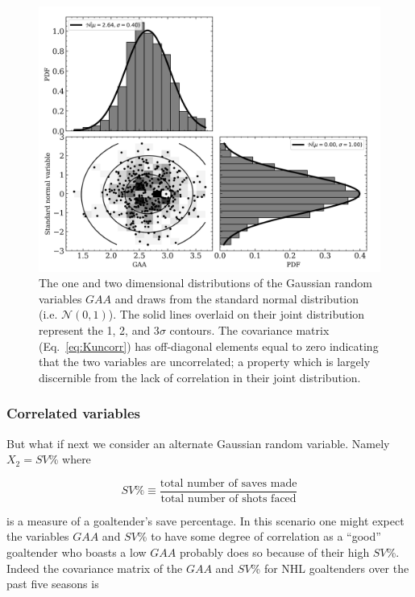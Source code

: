 \begin{figure}
  \centering
  \includegraphics[width=.9\textwidth]{figures/uncorr_2d.png}
  \caption[Uncorrelated Gaussian random variables in two dimensions.]
      {The one and two dimensional distributions of the Gaussian random
        variables $GAA$ and draws from the standard normal distribution (i.e. $\mathcal{N}(0,1)$).
        The solid
    lines overlaid on their joint distribution represent the 1, 2, and 3$\sigma$
    contours. The covariance matrix (Eq.~\ref{eq:Kuncorr}) has off-diagonal
    elements equal to zero indicating that the two variables are uncorrelated;
    a property which is largely discernible from the lack of correlation in their joint
    distribution.}
  \label{fig:uncorr2d}
\end{figure}

\subsubsection{Correlated variables}
But what if next we consider an alternate Gaussian random variable. Namely
$X_2 = SV$\% where

\begin{equation}
  SV\% \equiv \frac{\text{total number of saves made}}{\text{total number of shots faced}}
\end{equation}

\noindent is a measure of a goaltender's save percentage. In this scenario one
might expect the variables $GAA$ and $SV$\% to have some degree of correlation
as a ``good'' goaltender who boasts a low $GAA$ probably does so because of their
high $SV$\%. Indeed the covariance matrix of the $GAA$ and $SV$\% for NHL
goaltenders over the past five seasons is

